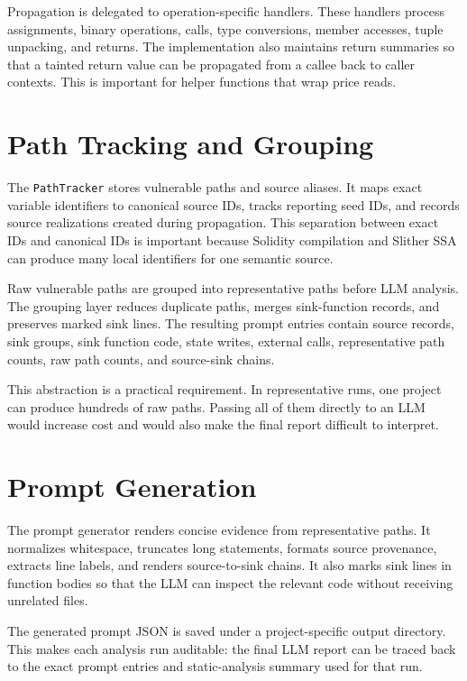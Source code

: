 Propagation is delegated to operation-specific handlers. These handlers process
assignments, binary operations, calls, type conversions, member accesses, tuple
unpacking, and returns. The implementation also maintains return summaries so
that a tainted return value can be propagated from a callee back to caller
contexts. This is important for helper functions that wrap price reads.

\section{Path Tracking and Grouping}

The \texttt{PathTracker} stores vulnerable paths and source aliases. It maps
exact variable identifiers to canonical source IDs, tracks reporting seed IDs,
and records source realizations created during propagation. This separation
between exact IDs and canonical IDs is important because Solidity compilation
and Slither SSA can produce many local identifiers for one semantic source.

Raw vulnerable paths are grouped into representative paths before LLM analysis.
The grouping layer reduces duplicate paths, merges sink-function records, and
preserves marked sink lines. The resulting prompt entries contain source
records, sink groups, sink function code, state writes, external calls,
representative path counts, raw path counts, and source-sink chains.

This abstraction is a practical requirement. In representative runs, one
project can produce hundreds of raw paths. Passing all of them directly to an
LLM would increase cost and would also make the final report difficult to
interpret.

\section{Prompt Generation}

The prompt generator renders concise evidence from representative paths. It
normalizes whitespace, truncates long statements, formats source provenance,
extracts line labels, and renders source-to-sink chains. It also marks sink
lines in function bodies so that the LLM can inspect the relevant code without
receiving unrelated files.

The generated prompt JSON is saved under a project-specific output directory.
This makes each analysis run auditable: the final LLM report can be traced back
to the exact prompt entries and static-analysis summary used for that run.

